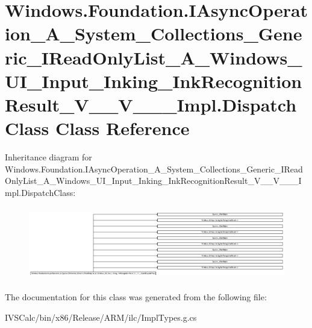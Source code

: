 \hypertarget{class_windows_1_1_foundation_1_1_i_async_operation___a___system___collections___generic___i_read9d8c1e1aa028a51e4aa258592349dd6d}{}\section{Windows.\+Foundation.\+I\+Async\+Operation\+\_\+\+A\+\_\+\+System\+\_\+\+Collections\+\_\+\+Generic\+\_\+\+I\+Read\+Only\+List\+\_\+\+A\+\_\+\+Windows\+\_\+\+U\+I\+\_\+\+Input\+\_\+\+Inking\+\_\+\+Ink\+Recognition\+Result\+\_\+\+V\+\_\+\+\_\+\+V\+\_\+\+\_\+\+\_\+\+Impl.\+Dispatch\+Class Class Reference}
\label{class_windows_1_1_foundation_1_1_i_async_operation___a___system___collections___generic___i_read9d8c1e1aa028a51e4aa258592349dd6d}
Inheritance diagram for Windows.\+Foundation.\+I\+Async\+Operation\+\_\+\+A\+\_\+\+System\+\_\+\+Collections\+\_\+\+Generic\+\_\+\+I\+Read\+Only\+List\+\_\+\+A\+\_\+\+Windows\+\_\+\+U\+I\+\_\+\+Input\+\_\+\+Inking\+\_\+\+Ink\+Recognition\+Result\+\_\+\+V\+\_\+\+\_\+\+V\+\_\+\+\_\+\+\_\+\+Impl.\+Dispatch\+Class\+:\begin{figure}[H]
\begin{center}
\leavevmode
\includegraphics[height=3.211679cm]{class_windows_1_1_foundation_1_1_i_async_operation___a___system___collections___generic___i_read9d8c1e1aa028a51e4aa258592349dd6d}
\end{center}
\end{figure}


The documentation for this class was generated from the following file\+:\begin{DoxyCompactItemize}
\item 
I\+V\+S\+Calc/bin/x86/\+Release/\+A\+R\+M/ilc/Impl\+Types.\+g.\+cs\end{DoxyCompactItemize}
